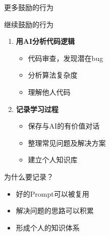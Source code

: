 \begin{frame}{更多鼓励的行为}
	\begin{exampleblock}{继续鼓励的行为}
		\begin{enumerate}
			\item \textbf{用AI分析代码逻辑}
			\begin{itemize}
				\item 代码审查，发现潜在bug
				\item 分析算法复杂度
				\item 理解他人代码
			\end{itemize}

			\item \textbf{记录学习过程}
			\begin{itemize}
				\item 保存与AI的有价值对话
				\item 整理常见问题及解决方案
				\item 建立个人知识库
			\end{itemize}
		\end{enumerate}
	\end{exampleblock}

	\vspace{0.3cm}

	\begin{block}{为什么要记录？}
		\begin{itemize}
			\item 好的Prompt可以被复用
			\item 解决问题的思路可以积累
			\item 形成个人的知识体系
		\end{itemize}
	\end{block}
\end{frame}


